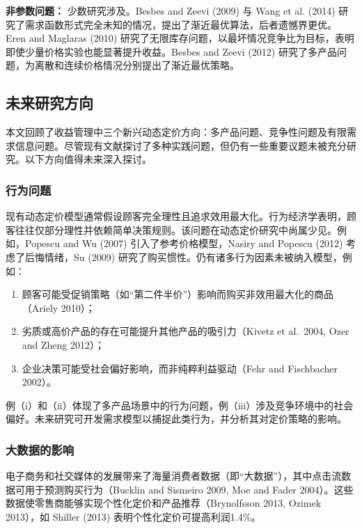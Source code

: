 \textbf{非参数问题：}
少数研究涉及。Besbes and Zeevi (2009) 与 Wang et al. (2014) 研究了需求函数形式完全未知的情况，提出了渐近最优算法，后者遗憾界更优。Eren and Maglaras (2010) 研究了无限库存问题，以最坏情况竞争比为目标，表明即使少量价格实验也能显著提升收益。Besbes and Zeevi (2012) 研究了多产品问题，为离散和连续价格情况分别提出了渐近最优策略。


\subsection{未来研究方向}\label{future-research-directions}

本文回顾了收益管理中三个新兴动态定价方向：多产品问题、竞争性问题及有限需求信息问题。尽管现有文献探讨了多种实践问题，但仍有一些重要议题未被充分研究。以下方向值得未来深入探讨。

\subsubsection{行为问题}
现有动态定价模型通常假设顾客完全理性且追求效用最大化。行为经济学表明，顾客往往仅部分理性并依赖简单决策规则。该问题在动态定价研究中尚属少见。例如，Popescu and Wu (2007) 引入了参考价格模型，Nasiry and Popescu (2012) 考虑了后悔情绪，Su (2009) 研究了购买惯性。仍有诸多行为因素未被纳入模型，例如：

\begin{enumerate}
	\def\labelenumi{\roman{enumi}.}
	\item 顾客可能受促销策略（如“第二件半价”）影响而购买非效用最大化的商品（Ariely 2010）；
	\item 劣质或高价产品的存在可能提升其他产品的吸引力（Kivetz et al.~2004, Ozer and Zheng 2012）；
	\item 企业决策可能受社会偏好影响，而非纯粹利益驱动（Fehr and Fischbacher 2002）。
\end{enumerate}

例（i）和（ii）体现了多产品场景中的行为问题，例（iii）涉及竞争环境中的社会偏好。未来研究可开发需求模型以捕捉此类行为，并分析其对定价策略的影响。

\subsubsection{大数据的影响}
电子商务和社交媒体的发展带来了海量消费者数据（即“大数据”），其中点击流数据可用于预测购买行为（Bucklin and Sismeiro 2009, Moe and Fader 2004）。这些数据使零售商能够实现个性化定价和产品推荐（Brynolfsson 2013, Ozimek 2013），如 Shiller (2013) 表明个性化定价可提高利润1.4\%。

